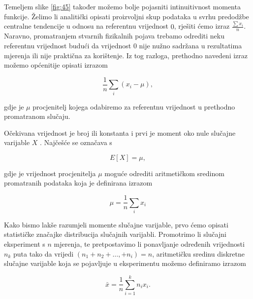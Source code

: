 \documentclass[a4paper,12pt,oneside]{memoir}
\begin{document}
                Temeljem slike \ref{fig:45} također možemo bolje pojasniti intinuitivnost momenta funkcije. Želimo li analitički opisati proizvoljni skup podataka u svrhu predodžbe centralne tendencije u odnosu na referentnu vrijednost $0$, rješiti ćemo izraz $\frac{\sum x_i}{n}$. Naravno, promatranjem stvarnih fizikalnih pojava trebamo odrediti neku referentnu vrijednost budući da vrijednost $0$ nije nužno sadržana u rezultatima mjerenja ili nije praktična za korištenje. Iz tog razloga, prethodno navedeni izraz možemo općenitije opisati izrazom

                \begin{equation}
                    \frac{1}{n}\displaystyle\sum_{i}^{}(x_i-\mu),
                \end{equation}

                gdje je $\mu$ procjenitelj kojega odabiremo za referentnu vrijednost u prethodno promatranom slučaju.

                Očekivana vrijednost je broj ili konstanta i prvi je moment oko nule slučajne varijable $X$ \cite{Bahovec}. Najčešće se označava s

                \begin{equation}
                    E\left[X\right]=\mu,
                    \label{eq:412}
                \end{equation}
                
                gdje je vrijednost procjenitelja $\mu$ moguće odrediti aritmetičkom sredinom promatranih podataka koja je definirana izrazom

                \begin{equation}
                    \mu=\frac{1}{n}\displaystyle\sum_{i}^{}x_i
                \end{equation}

                Kako bismo lakše razumjeli momente slučajne varijable, prvo ćemo opisati statističke značajke distribucija slučajnih varijabli. Promotrimo li slučajni eksperiment s $n$ mjerenja, te pretpostavimo li ponavljanje određenih vrijednosti $n_k$ puta tako da vrijedi $(n_1+n_2+\ldots,+n_i)=n$, aritmetičku sredinu diskretne slučajne varijable koja se pojavljuje u eksperimentu možemo definiramo izrazom

                \begin{equation}
                    \bar{x}=\frac{1}{n}\displaystyle\sum_{i=1}^{k}n_ix_i.
                \end{equation}
\end{document}
